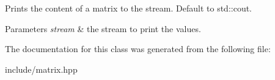 Prints the content of a matrix to the stream. Default to std\+::cout. 


\begin{DoxyParams}{Parameters}
{\em stream} & the stream to print the values. \\
\hline
\end{DoxyParams}


The documentation for this class was generated from the following file\+:\begin{DoxyCompactItemize}
\item 
include/matrix.\+hpp\end{DoxyCompactItemize}
